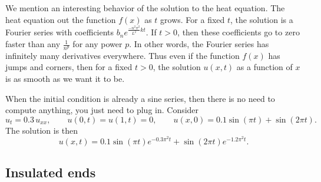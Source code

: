 We mention an interesting behavior of the solution to the heat equation.
The heat equation
 out the function $f(x)$ as $t$ grows.  For a fixed $t$,
the solution is a Fourier series with coefficients
$b_n e^{\frac{-n^2 \pi^2}{L^2} k t}$.  If $t > 0$, then these coefficients
go to zero faster than any $\frac{1}{n^p}$ for any power $p$.  In other
words, the Fourier series has infinitely many derivatives everywhere.
Thus even if the function $f(x)$ has jumps and corners, then for
a fixed $t > 0$, the solution
$u(x,t)$ as a function of $x$ is as smooth as we want it
to be.

\begin{example}
When the initial condition is already a sine series, then there is no need
to compute anything, you just need to plug in.  Consider
\begin{equation*}
u_t = 0.3 \, u_{xx}, \qquad u(0,t)=u(1,t)=0, \qquad u(x,0) = 0.1 \sin(\pi t) +
\sin(2\pi t) .
\end{equation*}
The solution is then
\begin{equation*}
u(x,t) =
0.1 \sin(\pi t) e^{- 0.3 \pi^2 t}
+ 
\sin(2 \pi t) e^{- 1.2 \pi^2 t} .
\end{equation*}
\end{example}

\subsection{Insulated ends}

